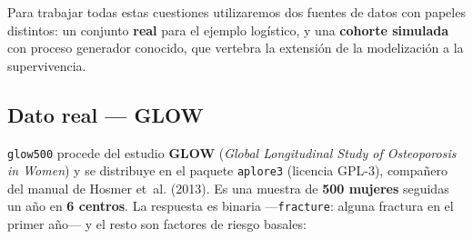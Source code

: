 \documentclass[
  letterpaper,
  DIV=11,
  numbers=noendperiod]{scrartcl}
\begin{document}
Para trabajar todas estas cuestiones utilizaremos dos fuentes de datos
con papeles distintos: un conjunto \textbf{real} para el ejemplo
logístico, y una \textbf{cohorte simulada} con proceso generador
conocido, que vertebra la extensión de la modelización a la
supervivencia.

\hypertarget{sec-datos-glow}{%
\subsection{Dato real --- GLOW}\label{sec-datos-glow}}

\texttt{glow500} procede del estudio \textbf{GLOW} (\emph{Global
Longitudinal Study of Osteoporosis in Women}) y se distribuye en el
paquete \texttt{aplore3} (licencia GPL-3), compañero del manual de
Hosmer et~al. (2013). Es una muestra de \textbf{500 mujeres} seguidas un
año en \textbf{6 centros}. La respuesta es binaria ---\texttt{fracture}:
alguna fractura en el primer año--- y el resto son factores de riesgo
basales:
\end{document}

